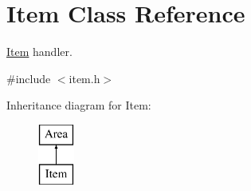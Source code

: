 \hypertarget{classItem}{
\section{Item Class Reference}
\label{classItem}
}


\hyperlink{classItem}{Item} handler.  




{\ttfamily \#include $<$item.h$>$}

Inheritance diagram for Item:\begin{figure}[H]
\begin{center}
\leavevmode
\includegraphics[height=2.000000cm]{classItem}
\end{center}
\end{figure}
